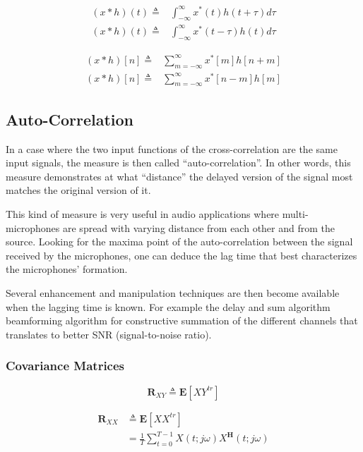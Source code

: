 \begin{align}
    (x * h)(t) \triangleq & \int^{\infty}_{-\infty} x^{*}(t)h(t+\tau) d\tau \\
    (x * h)(t) \triangleq & \int^{\infty}_{-\infty} x^{*}(t-\tau)h(t) d\tau
\end{align}

\begin{align}
    (x * h)[n] \triangleq & \sum^{\infty}_{m=-\infty} x^{*}[m]h[n+m] \\
    (x * h)[n] \triangleq & \sum^{\infty}_{m=-\infty} x^{*}[n-m]h[m]
\end{align}

\subsection{Auto-Correlation}
In a case where the two input functions
of the cross-correlation are the same input signals,
the measure is then called ``auto-correlation''.
In other words, this measure demonstrates
at what ``distance'' the delayed version of the signal
most matches the original version of it.

This kind of measure is very useful in audio
applications where multi-microphones are spread
with varying distance from each other and from the
source. Looking for the maxima point of the
auto-correlation between the signal received by
the microphones, one can deduce the lag time
that best characterizes the microphones' formation.

Several enhancement and manipulation techniques
are then become available when the lagging
time is known.
For example the delay and sum algorithm beamforming
algorithm for constructive summation of the different
channels that translates
to better SNR (signal-to-noise ratio).

\subsubsection{Covariance Matrices}
\begin{equation}
    \mathbf{R}_{XY} \triangleq \mathbf{E}[XY^{tr}]
\end{equation}

\begin{align}
    \mathbf{R}_{XX} & \triangleq \mathbf{E}[XX^{tr}] \\
                    & = \frac{1}{T} \sum^{T-1}_{t=0}
    {X}(t;j\omega){X}^{\mathbf{H}}(t;j\omega)
\end{align}

